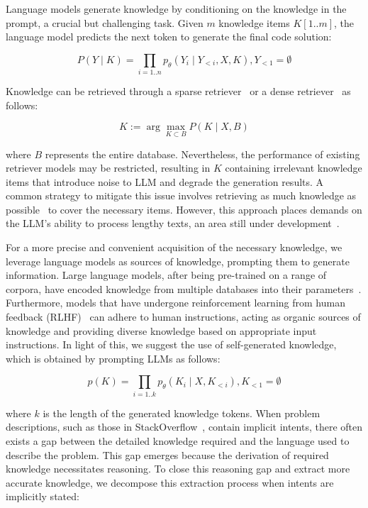 \documentclass[a4paper,oneside]{book}
\begin{document}
Language models generate knowledge by conditioning on the knowledge in the prompt, a crucial but challenging task. Given $m$ knowledge items $K[1 . . m]$, the language model predicts the next token to generate the final code solution:

\begin{equation}
    P(Y \mid K)=\prod_{i=1 . . n} p_{\theta}\left(Y_{i} \mid Y_{<i}, X, K\right), Y_{<1}=\emptyset
\end{equation}

Knowledge can be retrieved through a sparse retriever~\cite{robertson1994some} or a dense retriever~\cite{reimers2019sentence, gao2021simcse} as follows:

\begin{equation}
    K:=\arg \max _{K \subset B} P(K \mid X, B)
\end{equation}

where $B$ represents the entire database. Nevertheless, the performance of existing retriever models may be restricted, resulting in $K$ containing irrelevant knowledge items that introduce noise to LLM and degrade the generation results. A common strategy to mitigate this issue involves retrieving as much knowledge as possible~\cite{borgeaud2022improving} to cover the necessary items. However, this approach places demands on the LLM's ability to process lengthy texts, an area still under development~\cite{li2023context}.

For a more precise and convenient acquisition of the necessary knowledge, we leverage language models as sources of knowledge, prompting them to generate information. Large language models, after being pre-trained on a range of corpora, have encoded knowledge from multiple databases into their parameters~\cite{geva2020transformer}. Furthermore, models that have undergone reinforcement learning from human feedback (RLHF)~\cite{ouyang2022training} can adhere to human instructions, acting as organic sources of knowledge and providing diverse knowledge based on appropriate input instructions. In light of this, we suggest the use of self-generated knowledge, which is obtained by prompting LLMs as follows:

\begin{equation}
    p(K)=\prod_{i=1 . . k} p_{\theta}\left(K_{i} \mid X, K_{<i}\right), K_{<1}=\emptyset
\end{equation}

where $k$ is the length of the generated knowledge tokens. When problem descriptions, such as those in StackOverflow~\cite{pmlr-v202-lai23b}, contain implicit intents, there often exists a gap between the detailed knowledge required and the language used to describe the problem. This gap emerges because the derivation of required knowledge necessitates reasoning. To close this reasoning gap and extract more accurate knowledge, we decompose this extraction process when intents are implicitly stated:
\end{document}
